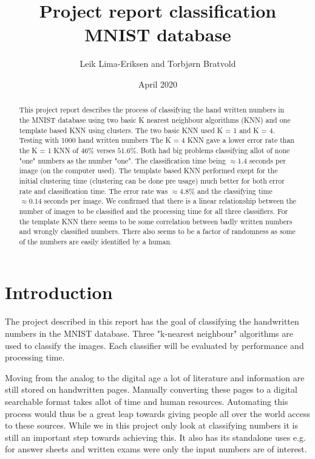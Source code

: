 \documentclass{article}
\title{Project report classification MNIST database}
\author{Leik Lima-Eriksen and Torbjørn Bratvold}
\date{April 2020}
\begin{document}
\maketitle
\begin{abstract}

This project report describes the process of classifying the hand written numbers in the MNIST database\cite{MNIST} using two basic K nearest neighbour algorithms (KNN) and one template based KNN using clusters.  The two basic KNN used K = 1 and K = 4. Testing with 1000 hand written numbers The K = 4 KNN gave a lower error rate than the K = 1 KNN of $46\%$ verses $51.6\%$. Both had big problems classifying allot of none "one" numbers as the number "one". The classification time being $\approx1.4$ seconds per image (on the computer used). The template based KNN performed exept for the initial clustering  time (clustering can be done pre usage) much better for both error rate and classification time. The error rate was $\approx 4.8\%$ and the classifying time $\approx 0.14$ seconds per image. We confirmed that there is a linear relationship between the number of images to be classified and the processing time for all three classifiers. For the template KNN there seems to be some correlation between badly written numbers and wrongly classified numbers. There also seems to be a factor of randomness as some of the numbers are easily identified by a human.   
    
\end{abstract} 

\newpage
\tableofcontents
\newpage
\section{Introduction}
The project described in this report has the goal of classifying the handwritten numbers in the MNIST database\cite{MNIST}.
Three "k-nearest neighbour" algorithms are used to classify the images. Each classifier will be evaluated by performance and processing time.

Moving from the analog to the digital age a lot of literature and information are still stored on handwritten pages. Manually converting these pages to a digital searchable format takes allot of time and human resources. Automating this process would thus be a great leap towards giving people all over the world access to these sources. While we in this project only look at classifying numbers it is still an important step towards achieving this. It also has its standalone uses e.g. for answer sheets and written exams were only the input numbers are of interest.    
\end{document}

